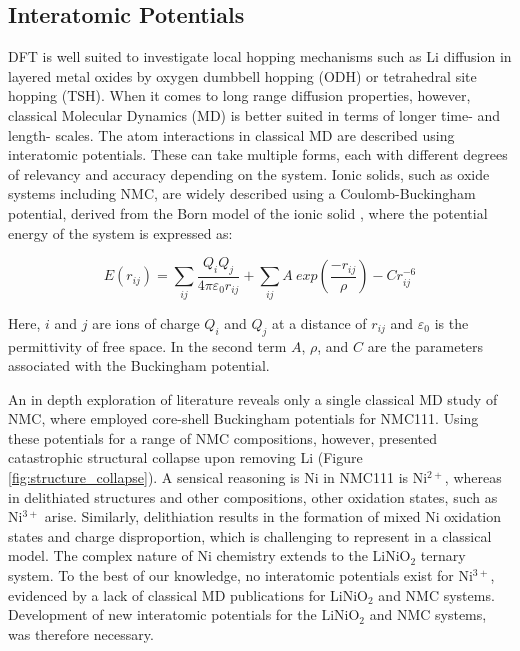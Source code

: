\documentclass[aps,prb,twocolumn,superscriptaddress,reprint]{revtex4-1}
\begin{document}
 \subsection{Interatomic Potentials}
DFT is well suited to investigate local hopping mechanisms such as Li diffusion in layered metal oxides by oxygen dumbbell hopping (ODH) or tetrahedral site hopping (TSH). \cite{van_der_ven_layered_2001, van_der_ven_LiTiS2_2008} When it comes to long range diffusion properties, however, classical Molecular Dynamics (MD) is better suited in terms of longer time- and length- scales. The atom interactions in classical MD are described using interatomic potentials. These can take multiple forms, each with different degrees of relevancy and accuracy depending on the system. Ionic solids, such as oxide systems including NMC, are widely described using a Coulomb-Buckingham potential, \cite{buckingham_classical_1938} derived from the Born model of the ionic solid \cite{born_1932, mayer_1932}, where the potential energy of the system is expressed as:

\begin{equation}
    E(r_{ij}) =  \sum_{ij} \frac{Q_i Q_j}{4\pi \varepsilon_0 r_{ij}} + \sum_{ij} A \ exp(\frac{-r_{ij}}{\rho}) - Cr_{ij}^{-6}
\end{equation}

Here, $i$ and $j$ are ions of charge $Q_i$ and $Q_j$ at a distance of $r_{ij}$ and $\varepsilon_0$ is the permittivity of free space. In the second term $A$, $\rho$, and $C$ are the parameters associated with the Buckingham potential.

An in depth exploration of literature reveals only a single classical MD study of NMC, where \citeauthor{Lee_and_Park_2012} employed core-shell Buckingham potentials for NMC111. \cite{Lee_and_Park_2012} Using these potentials for a range of NMC compositions, however, presented  catastrophic structural collapse upon removing Li (Figure \ref{fig:structure_collapse}). A sensical reasoning is Ni in NMC111 is Ni$^{2+}$, whereas in delithiated structures and other compositions, other oxidation states, such as Ni$^{3+}$ arise. Similarly, delithiation results in the formation of mixed Ni oxidation states and charge disproportion, which is challenging to represent in a classical model. \cite{Nakamura_2019,Kim_2002,Alonso_1999} The complex nature of Ni chemistry extends to the LiNiO$_2$ ternary system. To the best of our knowledge, no interatomic potentials exist for Ni$^{3+}$, evidenced by a lack of classical MD publications for LiNiO$_2$ and NMC systems. Development of new interatomic potentials for the LiNiO$_2$ and NMC systems, was therefore necessary.
\end{document}
